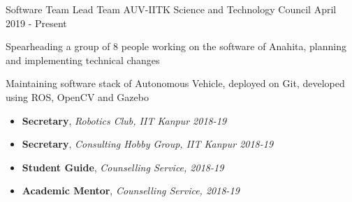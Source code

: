 
 \begin{cventries}
 \cventry
    {Software Team Lead}
    {Team AUV-IITK}
    {Science and Technology Council}
    {April 2019 - Present}
    {
       \begin{cvitems}
       \item  {Spearheading a group of 8 people working on the software of Anahita, planning and implementing technical changes}
        \item {Maintaining software stack of Autonomous Vehicle, deployed on Git, developed using ROS, OpenCV and Gazebo}
       \end{cvitems}
    }
  \end{cventries}

\begin{itemize}
\item \textbf{Secretary}, \emph{Robotics Club, IIT Kanpur 2018-19}
\item \textbf{Secretary}, \emph{Consulting Hobby Group, IIT Kanpur 2018-19}
\item \textbf{Student Guide}, \emph{Counselling Service, 2018-19}
\item \textbf{Academic Mentor}, \emph{Counselling Service, 2018-19}
\end{itemize}



